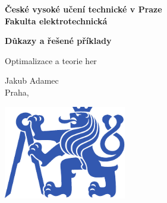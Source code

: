 \documentclass[11pt,a4paper]{article}
\begin{document}
 

\begin{titlepage}
    \centering
    \vspace*{2cm}

    {\Large \textbf{České vysoké učení technické v Praze}\\}
    \vspace{0.2cm}
    {\Large \textbf{Fakulta elektrotechnická}\\}
    
    \vspace{1cm}
    {\Huge \textbf{Důkazy a řešené příklady}\\}

    \vspace{0.5cm}
    {\Large Optimalizace a teorie her\\}

    \vspace{2cm}
    { Jakub Adamec\\}
    { Praha, \the\year\\}

    \vspace{2cm}
    \includegraphics[width=0.4\textwidth]{media/symbol_cvut_plna_samostatna_verze_Pantone.pdf}

    \vfill
\end{titlepage}

\clearpage
{}
\setcounter{page}{1}

\tableofcontents
{}

\clearpage
{}
\setcounter{page}{1} 





 
\end{document}
